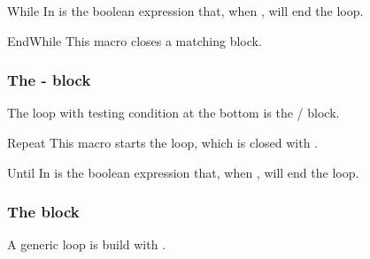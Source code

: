 \documentclass[a4paper, 11pt]{article}
\begin{document}
\begin{PDExample}
    \begin{algorithmic}
        \EndWhile
    \end{algorithmic}
\end{PDExample}

\begin{Macrodef}{While}{}{}
    In  is the boolean expression that, when \False, will end the loop.

    \BlockOptionsText
\end{Macrodef}

\begin{Macrodef}{EndWhile}{}{}
    This macro closes a matching  block.

    \MacroOptionsText
\end{Macrodef}

\subsubsection{The - block}
The loop with testing condition at the bottom is the / block.

\begin{PDExample}
    \begin{algorithmic}
        \Repeat
    \end{algorithmic}
\end{PDExample}

\begin{Macrodef}{Repeat}{}{}
    This macro starts the  loop, which is closed with .

    \BlockOptionsText
\end{Macrodef}

\begin{Macrodef}{Until}{}{}
    In  is the boolean expression that, when , will end the loop.

    \MacroOptionsText
\end{Macrodef}

\subsubsection{The  block}
A generic loop is build with .
\end{document}
